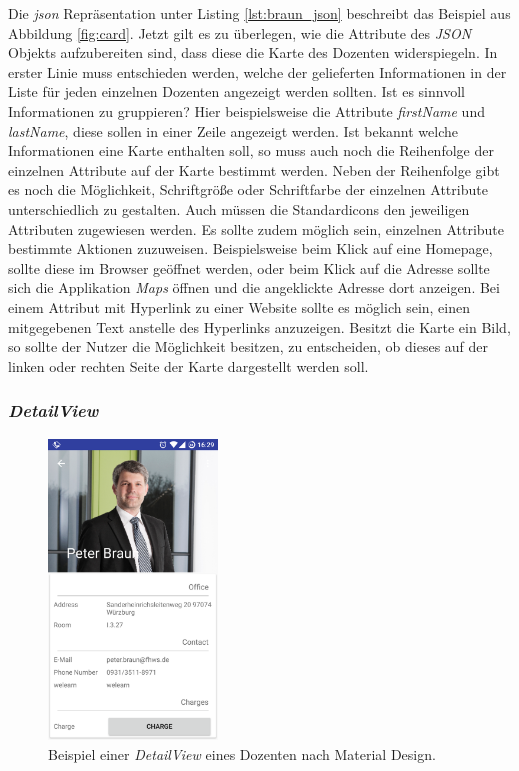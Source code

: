Die  \textit{\acf{json}} Repräsentation unter Listing \ref{lst:braun_json} beschreibt das Beispiel aus Abbildung \ref{fig:card}.
Jetzt gilt es zu überlegen, wie die Attribute des \textit{JSON} Objekts aufzubereiten sind, dass diese die Karte des Dozenten widerspiegeln. In erster Linie muss entschieden werden, welche der gelieferten Informationen in der Liste für jeden einzelnen Dozenten angezeigt werden sollten. Ist es sinnvoll Informationen zu gruppieren? Hier beispielsweise die Attribute \textit{firstName} und \textit{lastName}, diese sollen in einer Zeile angezeigt werden. Ist bekannt welche Informationen eine Karte enthalten soll, so muss auch noch die Reihenfolge der einzelnen Attribute auf der Karte bestimmt werden. Neben der Reihenfolge gibt es noch die Möglichkeit, Schriftgröße oder Schriftfarbe der einzelnen Attribute unterschiedlich zu gestalten. Auch müssen die Standardicons den jeweiligen Attributen zugewiesen werden. Es sollte zudem möglich sein, einzelnen Attribute bestimmte Aktionen zuzuweisen. Beispielsweise beim Klick auf eine Homepage, sollte diese im Browser geöffnet werden, oder beim Klick auf die Adresse sollte sich die Applikation \textit{Maps} öffnen und die angeklickte Adresse dort anzeigen. Bei einem Attribut mit Hyperlink zu einer Website sollte es möglich sein, einen mitgegebenen Text anstelle des Hyperlinks anzuzeigen.
Besitzt die Karte ein Bild, so sollte der Nutzer die Möglichkeit besitzen, zu entscheiden, ob dieses auf der linken oder rechten Seite der Karte dargestellt werden soll.

\newpage

\subsubsection{\textit{DetailView}}

\begin{figure}[H]
	\begin{center}
		\includegraphics[width=0.4\textwidth]{images/detail.png}
		\caption{Beispiel einer \textit{DetailView} eines Dozenten nach Material Design.}
		\label{fig:detail}
	\end{center}
\end{figure}

